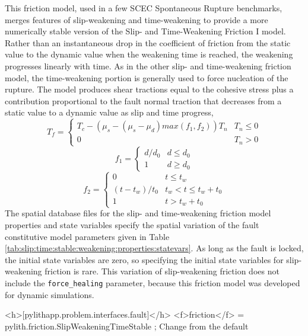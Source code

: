 This friction model, used in a few SCEC Spontaneous Rupture benchmarks,
merges features of slip-weakening and time-weakening to provide a
more numerically stable version of the Slip- and Time-Weakening Friction
I model. Rather than an instantaneous drop in the coefficient of friction
from the static value to the dynamic value when the weakening time
is reached, the weakening progresses linearly with time. As in the
other slip- and time-weakening friction model, the time-weakening
portion is generally used to force nucleation of the rupture. The
model produces shear tractions equal to the cohesive stress plus a
contribution proportional to the fault normal traction that decreases
from a static value to a dynamic value as slip and time progress,
\begin{equation}
T_{f}=\begin{cases}
T_{c}-(\mu_{s}-(\mu_{s}-\mu_{d})max(f_{1},f_{2}))T_{n} & T_{n}\leq0\\
0 & T_{n}>0
\end{cases}
\end{equation}
\begin{equation}
f_{1}=\begin{cases}
d/d_{0} & d\leq d_{0}\\
1 & d\ge d_{0}
\end{cases}
\end{equation}
\begin{equation}
f_{2}=\begin{cases}
0 & t\leq t_{w}\\
(t-t_{w})/t_{0} & t_{w}<t\le t_{w}+t_{0}\\
1 & t>t_{w}+t_{0}
\end{cases}
\end{equation}
The spatial database files for the slip- and time-weakening friction
model properties and state variables specify the spatial variation
of the fault constitutive model parameters given in Table \vref{tab:slip:time:stable:weakening:properties:statevars}.
As long as the fault is locked, the initial state variables are zero,
so specifying the initial state variables for slip-weakening friction
is rare. This variation of slip-weakening friction does not include
the \texttt{force\_healing} parameter, because this friction model
was developed for dynamic simulations.

\begin{cfg}
<h>[pylithapp.problem.interfaces.fault]</h>
<f>friction</f> = pylith.friction.SlipWeakeningTimeStable ; Change from the default
\end{cfg}

